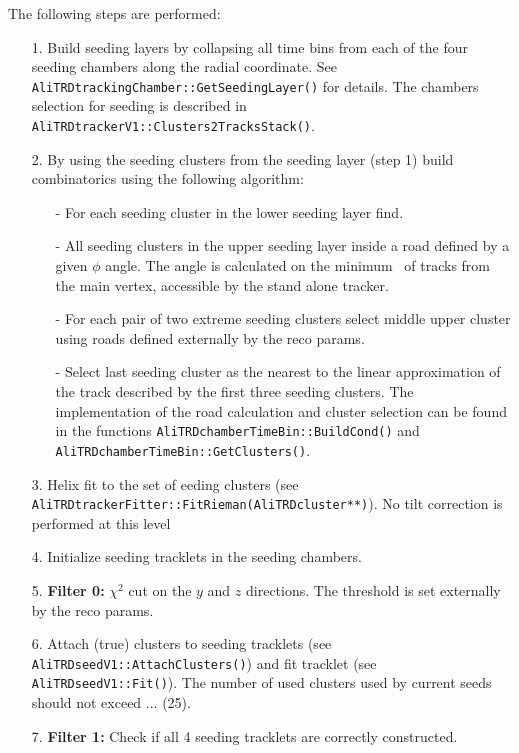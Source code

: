 \documentclass{alicetdr}
\begin{document}
The following steps are performed:
\begin{itemize}
\item[1.] Build seeding layers by collapsing all time bins from each of the four 
          seeding chambers along the radial coordinate. See 
          {\tt AliTRDtrackingChamber::GetSeedingLayer()} for details. The chambers 
          selection for seeding is described in 
          {\tt AliTRDtrackerV1::Clusters2\-TracksStack()}.
\item[2.] By using the seeding clusters from the seeding layer (step 1) build 
          combinatorics using the following algorithm:
  \begin{itemize}
  \item[-] For each seeding cluster in the lower seeding layer find.
  \item[-] All seeding clusters in the upper seeding layer inside a road defined by 
           a given $\phi$ angle. The angle is calculated on the minimum \pt\ of tracks 
           from the main vertex, accessible by the stand alone tracker.
  \item[-] For each pair of two extreme seeding clusters select middle upper cluster 
           using roads defined externally by the reco params.
  \item[-] Select last seeding cluster as the nearest to the linear approximation of 
           the track described by the first three seeding clusters. The implementation 
           of the road calculation and cluster selection can be found in the functions 
           {\tt AliTRDchamberTimeBin::Build\-Cond()} and 
           {\tt AliTRDchamberTimeBin::GetClusters()}.
  \end{itemize}
\item[3.] Helix fit to the set of eeding clusters 
          (see {\tt AliTRDtrackerFitter::FitRieman(AliTRD\-cluster**)}). No tilt 
          correction is performed at this level 
\item[4.] Initialize seeding tracklets in the seeding chambers.
\item[5.] {\bf Filter 0:} $\chi^{2}$ cut on the $y$ and $z$ directions. The threshold is 
          set externally by the reco params.
\item[6.] Attach (true) clusters to seeding tracklets 
          (see {\tt AliTRDseedV1::AttachClusters()}) and fit tracklet 
          (see {\tt AliTRDseedV1::Fit()}). The number of used clusters used by current 
          seeds should not exceed ... (25).
\item[7.] {\bf Filter 1:} Check if all 4 seeding tracklets are correctly constructed.

\end{itemize}
\end{document}

